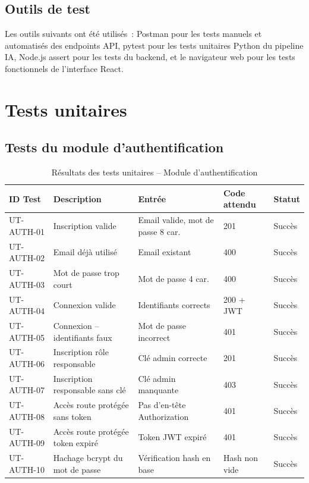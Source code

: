 \subsection{Outils de test}

Les outils suivants ont été utilisés~: Postman pour les tests manuels et automatisés des endpoints API, pytest pour les tests unitaires Python du pipeline IA, Node.js assert pour les tests du backend, et le navigateur web pour les tests fonctionnels de l'interface React.

\section{Tests unitaires}

\subsection{Tests du module d'authentification}

\begin{table}[H]
\centering
\caption{Résultats des tests unitaires -- Module d'authentification}
\label{tab:tests_auth}
\begin{tabularx}{\textwidth}{p{2.2cm} X p{3cm} p{1.5cm} p{1.2cm}}
\toprule
\textbf{ID Test} & \textbf{Description} & \textbf{Entrée} & \textbf{Code attendu} & \textbf{Statut} \\
\midrule
UT-AUTH-01 & Inscription valide                & Email valide, mot de passe 8 car. & 201 & \textcolor{green!60!black}{Succès} \\
UT-AUTH-02 & Email déjà utilisé                & Email existant                    & 400 & \textcolor{green!60!black}{Succès} \\
UT-AUTH-03 & Mot de passe trop court           & Mot de passe 4 car.               & 400 & \textcolor{green!60!black}{Succès} \\
UT-AUTH-04 & Connexion valide                  & Identifiants corrects             & 200 + JWT & \textcolor{green!60!black}{Succès} \\
UT-AUTH-05 & Connexion -- identifiants faux    & Mot de passe incorrect            & 401 & \textcolor{green!60!black}{Succès} \\
UT-AUTH-06 & Inscription rôle responsable      & Clé admin correcte                & 201 & \textcolor{green!60!black}{Succès} \\
UT-AUTH-07 & Inscription responsable sans clé  & Clé admin manquante               & 403 & \textcolor{green!60!black}{Succès} \\
UT-AUTH-08 & Accès route protégée sans token   & Pas d'en-tête Authorization       & 401 & \textcolor{green!60!black}{Succès} \\
UT-AUTH-09 & Accès route protégée token expiré & Token JWT expiré                  & 401 & \textcolor{green!60!black}{Succès} \\
UT-AUTH-10 & Hachage bcrypt du mot de passe    & Vérification hash en base         & Hash non vide & \textcolor{green!60!black}{Succès} \\
\bottomrule
\end{tabularx}
\end{table}

